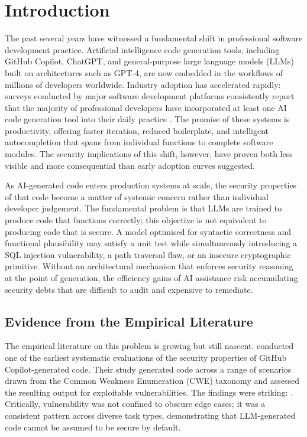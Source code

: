 \documentclass[11pt, a4paper]{article}
\begin{document}

\section{Introduction}

The past several years have witnessed a fundamental shift in professional software development practice. Artificial intelligence code generation tools, including GitHub Copilot, ChatGPT, and general-purpose large language models (LLMs) built on architectures such as GPT-4, are now embedded in the workflows of millions of developers worldwide. Industry adoption has accelerated rapidly: surveys conducted by major software development platforms consistently report that the majority of professional developers have incorporated at least one AI code generation tool into their daily practice \citep[see, for example,][]{pearce2022}. The promise of these systems is productivity, offering faster iteration, reduced boilerplate, and intelligent autocompletion that spans from individual functions to complete software modules. The security implications of this shift, however, have proven both less visible and more consequential than early adoption curves suggested.

As AI-generated code enters production systems at scale, the security properties of that code become a matter of systemic concern rather than individual developer judgement. The fundamental problem is that LLMs are trained to produce code that functions correctly; this objective is not equivalent to producing code that is secure. A model optimised for syntactic correctness and functional plausibility may satisfy a unit test while simultaneously introducing a SQL injection vulnerability, a path traversal flaw, or an insecure cryptographic primitive. Without an architectural mechanism that enforces security reasoning at the point of generation, the efficiency gains of AI assistance risk accumulating security debts that are difficult to audit and expensive to remediate.

\subsection*{Evidence from the Empirical Literature}

The empirical literature on this problem is growing but still nascent. \citet{pearce2022} conducted one of the earliest systematic evaluations of the security properties of GitHub Copilot-generated code. Their study generated code across a range of scenarios drawn from the Common Weakness Enumeration (CWE) taxonomy and assessed the resulting output for exploitable vulnerabilities. The findings were striking: \citep[Pearce et al. 2022 -- insert specific finding on the proportion of generated scenarios found to be vulnerable]{pearce2022}. Critically, vulnerability was not confined to obscure edge cases; it was a consistent pattern across diverse task types, demonstrating that LLM-generated code cannot be assumed to be secure by default.
\end{document}
